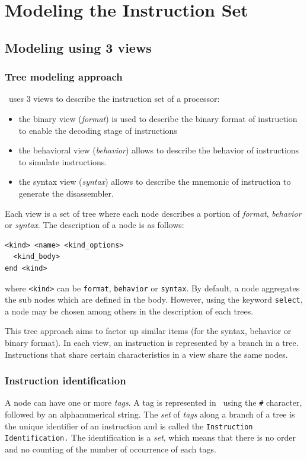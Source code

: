 \chapter{Modeling the Instruction Set}
\section{Modeling using 3 views}
\label{sec:modelisationArborescente}
\subsection{Tree modeling approach}
\harmless\ uses 3 views to describe the instruction set of a processor:
\begin{itemize}
\item the binary view (\emph{format}) is used to describe the binary format of instruction to enable the decoding stage of instructions
\item the behavioral view (\emph{behavior}) allows to describe the behavior of instructions to simulate instructions.
\item the syntax view (\emph{syntax}) allows to describe the mnemonic of instruction to generate the disassembler.
\end{itemize}

Each view is a set of tree where each node describes a portion of \emph{format}, \emph{behavior} or \emph{syntax}. The description of a node is as follows:
\begin{verbatim}
<kind> <name> <kind_options>
  <kind_body>
end <kind>
\end{verbatim}
where \texttt{<kind>} can be \texttt{format}, \texttt{behavior} or \texttt{syntax}. By default, a node aggregates the sub nodes which are defined in the body. However, using the keyword \texttt{select}, a node may be chosen among others in the description of each trees.

This tree approach aims to factor up similar items (for the syntax, behavior or binary format). In each view, an instruction is represented by a branch in a tree. Instructions that share certain characteristics in a view share the same nodes.

\subsection{Instruction identification}
\label{sec:signature}
A node can have one or more \emph{tags}. A tag is represented in  \harmless\ using the \texttt{\#} character, followed by an alphanumerical string.
The \emph{set} of \emph{tags} along a branch of a tree is the unique identifier of an instruction and is called the \texttt{Instruction Identification.} The identification is a \emph{set}, which means that there is no order and no counting of the number of occurrence of each tags.

